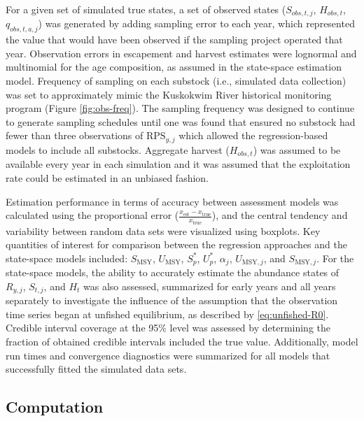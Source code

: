 \documentclass[12pt,]{book}
\theoremstyle{definition}
\theoremstyle{definition}
\theoremstyle{definition}
\theoremstyle{remark}
\begin{document}
For a given set of simulated true states, a set of observed states
(\(S_{obs,t,j}\), \(H_{obs,t}\), \(q_{obs,t,a,j}\)) was generated by
adding sampling error to each year, which represented the value that
would have been observed if the sampling project operated that year.
Observation errors in escapement and harvest estimates were lognormal
and multinomial for the age composition, as assumed in the state-space
estimation model. Frequency of sampling on each substock (i.e.,
simulated data collection) was set to approximately mimic the Kuskokwim
River historical monitoring program (Figure \ref{fig:obs-freq}). The
sampling frequency was designed to continue to generate sampling
schedules until one was found that ensured no substock had fewer than
three observations of \(\text{RPS}_{y,j}\) which allowed the
regression-based models to include all substocks. Aggregate harvest
(\(H_{obs,t}\)) was assumed to be available every year in each
simulation and it was assumed that the exploitation rate could be
estimated in an unbiased fashion.

Estimation performance in terms of accuracy between assessment models
was calculated using the proportional error
(\(\frac{x_{\text{est}} - x_{\text{true}}}{x_{\text{true}}}\)), and the
central tendency and variability between random data sets were
visualized using boxplots. Key quantities of interest for comparison
between the regression approaches and the state-space models included:
\(S_{\text{MSY}}\), \(U_{\text{MSY}}\), \(S^*_p\), \(U^*_p\),
\(\alpha_j\), \(U_{\text{MSY},j}\), and \(S_{\text{MSY},j}\). For the
state-space models, the ability to accurately estimate the abundance
states of \(R_{y,j}\), \(S_{t,j}\), and \(H_{t}\) was also assessed,
summarized for early years and all years separately to investigate the
influence of the assumption that the observation time series began at
unfished equilibrium, as described by \eqref{eq:unfished-R0}. Credible
interval coverage at the 95\% level was assessed by determining the
fraction of obtained credible intervals included the true value.
Additionally, model run times and convergence diagnostics were
summarized for all models that successfully fitted the simulated data
sets.

\subsection{Computation}\label{computation}
\end{document}

